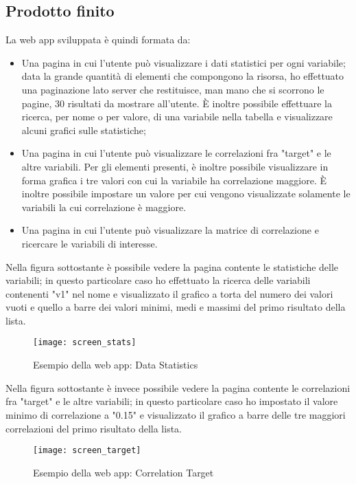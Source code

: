 \subsection{Prodotto finito}
La \gls{web app} sviluppata è quindi formata da:
\begin{itemize}
	\item Una pagina in cui l'utente può visualizzare i dati statistici per ogni variabile; data la grande quantità di elementi che compongono la risorsa, ho effettuato una paginazione lato server che restituisce, man mano che si scorrono le pagine, 30 risultati da mostrare all'utente. È inoltre possibile effettuare la ricerca, per nome o per valore, di una variabile nella tabella e visualizzare alcuni grafici sulle statistiche;
	\item Una pagina in cui l'utente può visualizzare le correlazioni fra "target" e le altre variabili. Per gli elementi presenti, è inoltre possibile visualizzare in forma grafica i tre valori con cui la variabile ha correlazione maggiore. È inoltre possibile impostare un valore per cui vengono visualizzate solamente le variabili la cui correlazione è maggiore.
	\item Una pagina in cui l'utente può visualizzare la matrice di correlazione e ricercare le variabili di interesse.
\end{itemize}
Nella figura sottostante è possibile vedere la pagina contente le statistiche delle variabili; in questo particolare caso ho effettuato la ricerca delle variabili contenenti "v1" nel nome e visualizzato il grafico a torta del numero dei valori vuoti e quello a barre dei valori minimi, medi e massimi del primo risultato della lista.\\
\begin{figure}[!h]
	\centering
	\texttt{[image: screen\_stats]}
	\caption{Esempio della web app: Data Statistics}
\end{figure}
\clearpage
\noindent Nella figura sottostante è invece possibile vedere la pagina contente le correlazioni fra "target" e le altre variabili; in questo particolare caso ho impostato il valore minimo di correlazione a "0.15" e visualizzato il grafico a barre delle tre maggiori correlazioni del primo risultato della lista.\\
\begin{figure}[!h]
	\centering
	\texttt{[image: screen\_target]}
	\caption{Esempio della web app: Correlation Target}
\end{figure}

